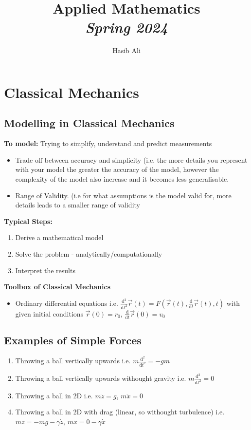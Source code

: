 \documentclass[letterpaper, 11pt]{article}
\author{Hasib Ali}
\date{}
\title{Applied Mathematics\\\medskip
\large \emph{Spring 2024}}
\begin{document}
\maketitle
\tableofcontents

\clearpage

\section{Classical Mechanics}
\label{sec:orga2e70bd}
\subsection{Modelling in Classical Mechanics}
\label{sec:org9a7f205}

\textbf{To model:} Trying to simplify, understand and predict measurements
\begin{itemize}
\item Trade off between accuracy and simplicity (i.e. the more details you represent with your model the greater the accuracy of the model, however the complexity of the model also increase and it becomes less generalisable.
\item Range of Validity. (i.e for what assumptions is the model valid for, more details leads to a smaller range of validity
\end{itemize}

\textbf{Typical Steps:}
\begin{enumerate}
\item Derive a mathematical model
\item Solve the problem - analytically/computationally
\item Interpret the results
\end{enumerate}

\textbf{Toolbox of Classical Mechanics}
\begin{itemize}
\item Ordinary differential equations i.e. \(\frac{\mathrm{d}^{2} }{\mathrm{d} t^{2}} \vec{r}(t) = F(\vec{r}(t), \frac{\mathrm{d} }{\mathrm{d} t} \vec{r}(t),t)\) with given initial conditions \(\vec{r}(0) = r_{0}\), \(\frac{\mathrm{d} }{\mathrm{d} t} \vec{r}(0) = v_{0}\)
\end{itemize}

\subsection{Examples of Simple Forces}
\label{sec:orge88f7f1}
\begin{enumerate}
\item Throwing a ball vertically upwards i.e. \(m \frac{\mathrm{d}^{2} }{\mathrm{d} t^2} = - gm\)
\item Throwing a ball vertically upwards withought gravity i.e.  \(m \frac{\mathrm{d}^{2} }{\mathrm{d} t^2} = 0\)
\item Throwing a ball in 2D i.e. \(m\ddot{z}=g\), \(m\ddot{x}=0\)
\item Throwing a ball in 2D with drag (linear, so withought turbulence) i.e. \(m\ddot{z}=-mg-\gamma \dot{z}\), \(m\ddot{x}=0-\gamma \dot{x}\)
\end{enumerate}
\end{document}
